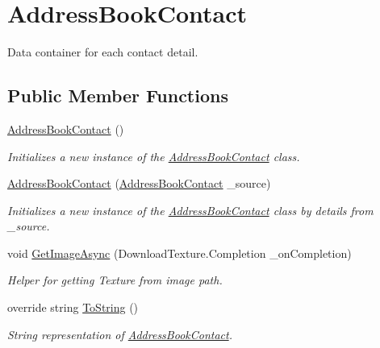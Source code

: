 \hypertarget{class_voxel_busters_1_1_native_plugins_1_1_address_book_contact}{}\section{Address\+Book\+Contact}
\label{class_voxel_busters_1_1_native_plugins_1_1_address_book_contact}


Data container for each contact detail.  


\subsection*{Public Member Functions}
\begin{DoxyCompactItemize}
\item 
\hyperlink{class_voxel_busters_1_1_native_plugins_1_1_address_book_contact_a4653f7f23dc37f9a4ef3b39db14bd63b}{Address\+Book\+Contact} ()
\begin{DoxyCompactList}\small\item\em Initializes a new instance of the \hyperlink{class_voxel_busters_1_1_native_plugins_1_1_address_book_contact}{Address\+Book\+Contact} class. \end{DoxyCompactList}\item 
\hyperlink{class_voxel_busters_1_1_native_plugins_1_1_address_book_contact_a78f6a98ad437213a29670ecffdfef9ef}{Address\+Book\+Contact} (\hyperlink{class_voxel_busters_1_1_native_plugins_1_1_address_book_contact}{Address\+Book\+Contact} \+\_\+source)
\begin{DoxyCompactList}\small\item\em Initializes a new instance of the \hyperlink{class_voxel_busters_1_1_native_plugins_1_1_address_book_contact}{Address\+Book\+Contact} class by details from \+\_\+source. \end{DoxyCompactList}\item 
void \hyperlink{class_voxel_busters_1_1_native_plugins_1_1_address_book_contact_aa84967c485d0c15f85f377f521b995d6}{Get\+Image\+Async} (Download\+Texture.\+Completion \+\_\+on\+Completion)
\begin{DoxyCompactList}\small\item\em Helper for getting Texture from image path. \end{DoxyCompactList}\item 
override string \hyperlink{class_voxel_busters_1_1_native_plugins_1_1_address_book_contact_aa73e7c4dd1df5fd5fbf81c7764ee1533}{To\+String} ()
\begin{DoxyCompactList}\small\item\em String representation of \hyperlink{class_voxel_busters_1_1_native_plugins_1_1_address_book_contact}{Address\+Book\+Contact}. \end{DoxyCompactList}\end{DoxyCompactItemize}
